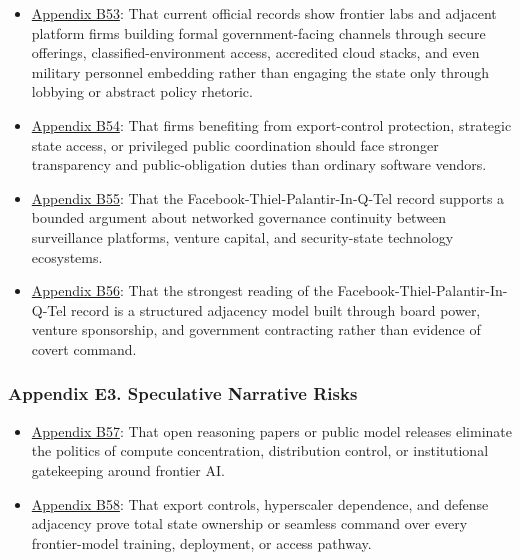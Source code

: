 \documentclass[
  american,
  11pt,
  letterpaper,
]{article}
\providecommand{\tightlist}{%
  \setlength{\itemsep}{0pt}\setlength{\parskip}{0pt}}
\begin{document}
\begin{itemize}
\tightlist
\item
  \hyperref[ch-07-appendix-b53-current-official-records-show-frontier-labs-and-adjacent-platform-firms-building]{Appendix
  B53}: That current official records show frontier labs and adjacent
  platform firms building formal government-facing channels through
  secure offerings, classified-environment access, accredited cloud
  stacks, and even military personnel embedding rather than engaging the
  state only through lobbying or abstract policy rhetoric.
\item
  \hyperref[ch-07-appendix-b54-firms-benefiting-from-export-control-protection-strategic-state-access-or-privi]{Appendix
  B54}: That firms benefiting from export-control protection, strategic
  state access, or privileged public coordination should face stronger
  transparency and public-obligation duties than ordinary software
  vendors.
\item
  \hyperref[ch-07-appendix-b55-the-facebook-thiel-palantir-in-q-tel-record-supports-a-bounded-argument-about-net]{Appendix
  B55}: That the Facebook-Thiel-Palantir-In-Q-Tel record supports a
  bounded argument about networked governance continuity between
  surveillance platforms, venture capital, and security-state technology
  ecosystems.
\item
  \hyperref[ch-07-appendix-b56-the-strongest-reading-of-the-facebook-thiel-palantir-in-q-tel-record-is-a-structu]{Appendix
  B56}: That the strongest reading of the
  Facebook-Thiel-Palantir-In-Q-Tel record is a structured adjacency
  model built through board power, venture sponsorship, and government
  contracting rather than evidence of covert command.
\end{itemize}

\subsubsection{Appendix E3. Speculative Narrative
Risks}\label{ch-07-appendix-e3-speculative-narrative-risks}

\begin{itemize}
\tightlist
\item
  \hyperref[ch-07-appendix-b57-open-reasoning-papers-or-public-model-releases-eliminate-the-politics-of-compute]{Appendix
  B57}: That open reasoning papers or public model releases eliminate
  the politics of compute concentration, distribution control, or
  institutional gatekeeping around frontier AI.
\item
  \hyperref[ch-07-appendix-b58-export-controls-hyperscaler-dependence-and-defense-adjacency-prove-total-state]{Appendix
  B58}: That export controls, hyperscaler dependence, and defense
  adjacency prove total state ownership or seamless command over every
  frontier-model training, deployment, or access pathway.
\end{itemize}
\end{document}
